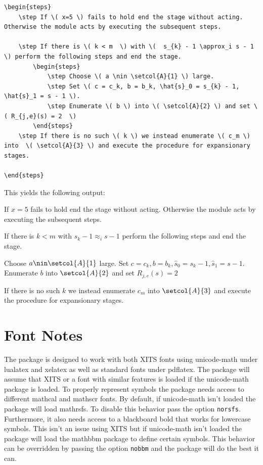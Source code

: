 \documentclass[leqno,11pt]{amsart}
\begin{document}
\begin{verbatim}
\begin{steps}
    \step If \( x=5 \) fails to hold end the stage without acting.  Otherwise the module acts by executing the subsequent steps.

    \step If there is \( k < m  \) with \(  s_{k} - 1 \approx_i s - 1  \) perform the following steps and end the stage. 
        \begin{steps}
            \step Choose \( a \nin \setcol{A}{1} \) large.
            \step Set \( c = c_k, b = b_k, \hat{s}_0 = s_{k} - 1, \hat{s}_1 = s - 1 \).
            \step Enumerate \( b \) into \( \setcol{A}{2} \) and set \( R_{j,e}(s) = 2  \)
        \end{steps}
    \step If there is no such \( k \) we instead enumerate \( c_m \) into  \( \setcol{A}{3} \) and execute the procedure for expansionary stages.

\end{steps}
\end{verbatim}

This yields the following output:

\begin{steps}
    \step If \( x=5 \) fails to hold end the stage without acting.  Otherwise the module acts by executing the subsequent steps.

    \step If there is \( k < m  \) with \(  s_{k} - 1 \approx_i s - 1  \) perform the following steps and end the stage. 
        \begin{steps}
            \step Choose \( a \nin \setcol{A}{1} \) large.
            \step Set \( c = c_k, b = b_k, \hat{s}_0 = s_{k} - 1, \hat{s}_1 = s - 1 \).
            \step Enumerate \( b \) into \( \setcol{A}{2} \) and set \( R_{j,e}(s) = 2  \)
        \end{steps}
    \step If there is no such \( k \) we instead enumerate \( c_m \) into  \( \setcol{A}{3} \) and execute the procedure for expansionary stages.

\end{steps}

\section{Font Notes}

The package is designed to work with both XITS fonts using unicode-math under lualatex and xelatex as well as standard fonts under pdflatex.  The package will assume that XITS or a font with similar features is loaded if the unicode-math package is loaded.  To properly represent symbols the package needs access to different mathcal and mathscr fonts.  By default, if unicode-math isn't loaded the package will load mathrsfs.  To disable this behavior pass the option \verb=norsfs=.  Furthermore, it also needs access to a blackboard bold that works for lowercase symbols.  This isn't an issue using XITS but if unicode-math isn't loaded the package will load the mathbbm package to define certain symbols.  This behavior can be overridden by passing the option \verb=nobbm= and the package will do the best it can.
\end{document}
